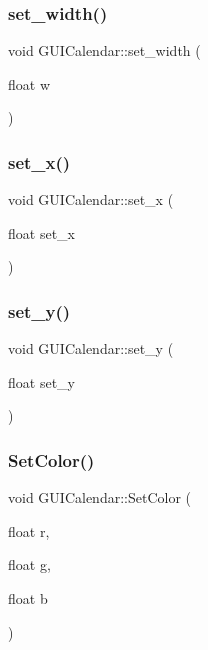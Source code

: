 \subsubsection{\texorpdfstring{set\+\_\+width()}{set\_width()}}
{\footnotesize\ttfamily void G\+U\+I\+Calendar\+::set\+\_\+width (\begin{DoxyParamCaption}\item[{float}]{w }\end{DoxyParamCaption})}

\hypertarget{class_g_u_i_calendar_abca879f6c1026d9a0fee40996c50f993}{}\label{class_g_u_i_calendar_abca879f6c1026d9a0fee40996c50f993} 
\subsubsection{\texorpdfstring{set\+\_\+x()}{set\_x()}}
{\footnotesize\ttfamily void G\+U\+I\+Calendar\+::set\+\_\+x (\begin{DoxyParamCaption}\item[{float}]{set\+\_\+x }\end{DoxyParamCaption})}

\hypertarget{class_g_u_i_calendar_a3f2449ec43fa0005c1f8ce0d4be5d309}{}\label{class_g_u_i_calendar_a3f2449ec43fa0005c1f8ce0d4be5d309} 
\subsubsection{\texorpdfstring{set\+\_\+y()}{set\_y()}}
{\footnotesize\ttfamily void G\+U\+I\+Calendar\+::set\+\_\+y (\begin{DoxyParamCaption}\item[{float}]{set\+\_\+y }\end{DoxyParamCaption})}

\hypertarget{class_g_u_i_calendar_acc8d2ad196d173e3c49ab05578d600a3}{}\label{class_g_u_i_calendar_acc8d2ad196d173e3c49ab05578d600a3} 
\subsubsection{\texorpdfstring{Set\+Color()}{SetColor()}}
{\footnotesize\ttfamily void G\+U\+I\+Calendar\+::\+Set\+Color (\begin{DoxyParamCaption}\item[{float}]{r,  }\item[{float}]{g,  }\item[{float}]{b }\end{DoxyParamCaption})}

